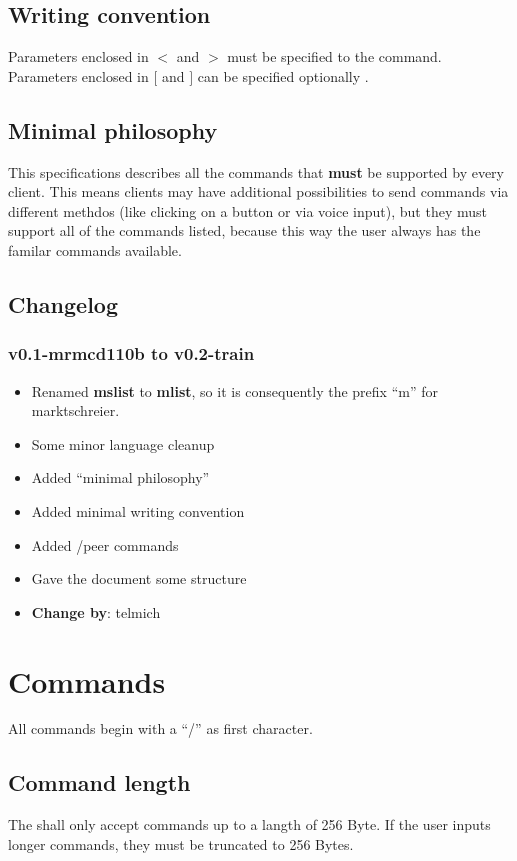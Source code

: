 \documentclass[12pt,a4paper]{book}
\begin{document}
\subsection{Writing convention}
Parameters enclosed in $<$ and $>$ must be specified to the command.
Parameters enclosed in $[$ and $]$ can be specified optionally .

\subsection{Minimal philosophy}
This specifications describes all the commands that \textbf{must} be
supported by every client. This means clients may have additional possibilities
to send commands via different methdos (like clicking on a button or via
voice input), but they must support all of the commands listed, because this
way the user always has the familar commands available.

\subsection{Changelog}
\subsubsection{v0.1-mrmcd110b to v0.2-train}
   \begin{itemize}
      \item Renamed \textbf{mslist} to \textbf{mlist}, so it is consequently the prefix
      "`m"' for marktschreier.
      \item Some minor language cleanup 
      \item Added "`minimal philosophy"'
      \item Added minimal writing convention
      \item Added /peer commands
      \item Gave the document some structure
      \item \textbf{Change by}: telmich
   \end{itemize}

\section{Commands}
All commands begin with a "`/"' as first character.

\subsection{Command length}
The shall only accept commands up to a langth of 256 Byte.
If the user inputs longer commands, they must be truncated
to 256 Bytes.
\end{document}
